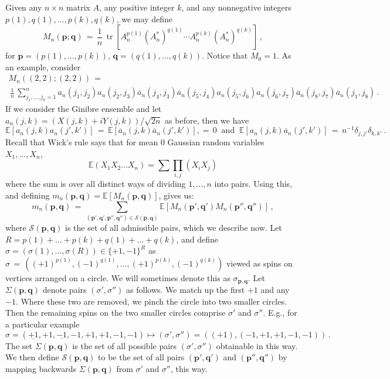\documentclass[12pt]{report}
\newcommand{\E}{\mathbb{E}}
\newcommand{\be}{\begin{equation}}
\newcommand{\ee}{\end{equation}}
\theoremstyle{definition}
\begin{document}
Given any $n\times n$ matrix $A$, any positive integer $k$, and any nonnegative integers $p(1),q(1),\dots,p(k),q(k)$, we may define
\be
M_n(\mathbf{p};\mathbf{q})\, 
=\, \frac{1}{n}\, \operatorname{tr}[A_n^{p(1)} (A_n^*)^{q(1)} \cdots A_n^{p(k)} (A_n^*)^{q(k)}]\, ,
\ee
for $\mathbf{p}=(p(1),\dots,p(k))$, $\mathbf{q}=(q(1),\dots,q(k))$.  Notice that $M_0=1$.
As an example, consider 
\begin{multline}
M_n((2,2);(2,2))\, = \\ \, \frac{1}{n}\, \sum_{j_1,\dots,j_8=1}^n a_n(j_1,j_2) a_n(j_2,j_3) \overline{a}_n(j_4,j_3) \overline{a}_n(j_5,j_4) a_n(j_5,j_6) a_n(j_6,j_7)
\overline{a}_n(j_8,j_7) \overline{a}_n(j_1,j_8)\, .
\end{multline}
If we consider the Ginibre ensemble and let $a_n(j,k) = (X(j,k)+iY(j,k))/\sqrt{2n}$ as before, then we have
\be
\E[a_n(j,k) a_n(j',k')]\, =\, \E[\overline{a}_n(j,k) \overline{a}_n(j',k')], =\, 0\ \text{ and } \
\E[a_n(j,k) \overline{a}_n(j',k')]\, =\, n^{-1} \delta_{j,j'} \delta_{k,k'}\, .
\ee
Recall that Wick's rule says that for mean $0$ Gaussian random variables $X_1,\dots,X_n$,
$$
\mathbb{E}(X_1X_2\dots X_n)=\sum \prod_{i,j}(X_iX_j)
$$
where the sum is over all distinct ways of dividing $1,\dots,n$ into pairs.  
Using this, and defining $m_n(\mathbf{p},\mathbf{q}) = \E[M_n(\mathbf{p},\mathbf{q})]$, gives us:
\begin{equation}
\label{eq:recurrence}
m_n(\mathbf{p},\mathbf{q})\, =\, \sum_{(\mathbf{p}',\mathbf{q}',\mathbf{p}'',\mathbf{q}'') \in \mathcal{S}(\mathbf{p},\mathbf{q})} 
\E[M_n(\mathbf{p}',\mathbf{q}') M_n(\mathbf{p}'',\mathbf{q}'')]\, ,
\end{equation}
where $\mathcal{S}(\mathbf{p},\mathbf{q})$ is the set of all admissible pairs, which we describe now.
Let $R = p(1)+\dots+p(k)+q(1)+\dots+q(k)$, 
and define $\sigma = (\sigma(1),\dots,\sigma(R)) \in \{+1,-1\}^R$
as $\sigma\, =\, ((+1)^{p(1)},(-1)^{q(1)},\dots,(+1)^{p(k)},(-1)^{q(k)})$
viewed as spins on vertices arranged on a circle.
We will sometimes denote this as $\sigma_{\mathbf{p},\mathbf{q}}$.
Let $\Sigma(\mathbf{p},\mathbf{q})$ denote pairs $(\sigma',\sigma'')$ as follows.
We match up the first $+1$ and any $-1$.
Where these two are removed, we pinch the circle into two smaller circles. 
Then the remaining spins on the two smaller circles comprise $\sigma'$ and $\sigma''$.
E.g., for a particular example
\be
\sigma = (\underline{+1},+1,\underline{-1},-1,+1,+1,-1,-1) \mapsto (\sigma',\sigma'') = ((+1),(-1,+1,+1,-1,-1))\, .
\ee
The set $\Sigma(\mathbf{p},\mathbf{q})$ is the set of all possible pairs $(\sigma',\sigma'')$ obtainable in this way.
We then define $\mathcal{S}(\mathbf{p},\mathbf{q})$ to be the set of all pairs $(\mathbf{p}',\mathbf{q}')$ and $(\mathbf{p}'',\mathbf{q}'')$ by mapping
backwards $\Sigma(\mathbf{p},\mathbf{q})$ from $\sigma'$ and $\sigma''$, this way.
\end{document}
